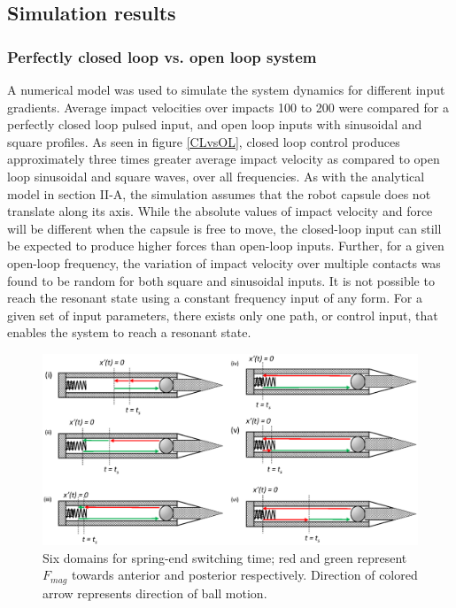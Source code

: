 \documentclass[letterpaper, 10 pt, conference]{ieeeconf}  %
\begin{document}
\subsection{Simulation results}

\subsubsection{Perfectly closed loop vs. open loop system}
\label{clol}

A numerical model was used to simulate the system dynamics for different input gradients. Average impact velocities over impacts 100 to 200 were compared for a perfectly closed loop pulsed input, and open loop inputs with sinusoidal and square profiles. As seen in figure \ref{CLvsOL}, closed loop control produces approximately three times greater average impact velocity as compared to open loop sinusoidal and square waves, over all frequencies. As with the analytical model in section II-A, the simulation assumes that the robot capsule does not translate along its axis. While the absolute values of impact velocity and force will be different when the capsule is free to move, the closed-loop input can still be expected to produce higher forces than open-loop inputs. Further, for a given open-loop frequency, the variation of impact velocity over multiple contacts was found to be random for both square and sinusoidal inputs. It is not possible to reach the resonant state using a constant frequency input of any form. For a given set of input parameters, there exists only one path, or control input, that enables the system to reach a resonant state. 
\begin{figure}
	\includegraphics[width=\linewidth]{Tswitch_cases_1to6.eps}
	\caption{Six domains for spring-end switching time; red and green represent $F_{mag}$ towards anterior and posterior respectively. Direction of colored arrow represents direction of ball motion.}
	\label{Tswitch}
\end{figure}
\end{document}
